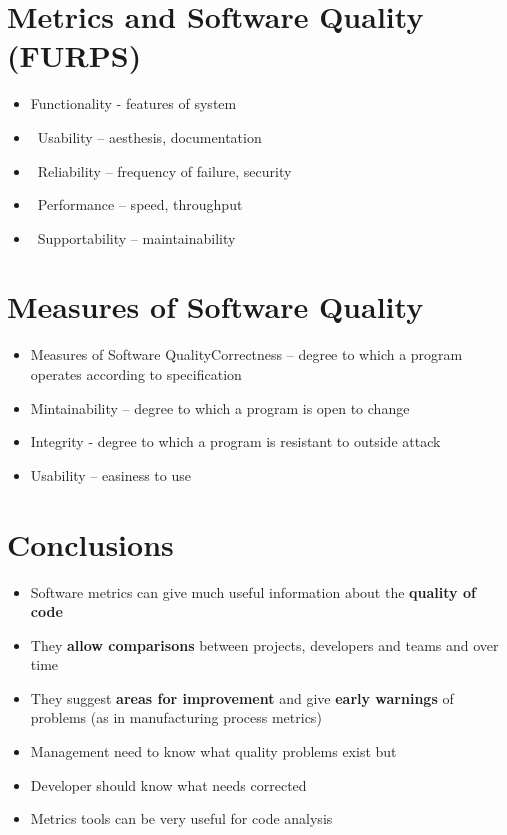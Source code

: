 \documentclass{article}
\begin{document}
\section{Metrics and Software Quality (FURPS)}
\begin{itemize}
  \item Functionality		-	features	of	system	
  \item  Usability	–	aesthesis,	documentation	
  \item  Reliability	–	frequency	of	failure,	security	
  \item  Performance	–	speed,	throughput	
  \item  Supportability	–	maintainability
\end{itemize}

\section{Measures of Software Quality}

\begin{itemize}
  \item Measures of Software QualityCorrectness	–	degree	to	which	a	program	operates	according	to	specification
  \item Mintainability	–	degree	to	which	a	program	is	open	to	change
  \item Integrity	-	degree	to	which	a	program	is	resistant	to	outside	attack	
  \item Usability	–	easiness	to	use
\end{itemize}

\section{Conclusions}
\begin{itemize}
  \item Software metrics can give much useful information about the \textbf{quality of code}
  \item They \textbf{allow comparisons} between projects, developers and teams and over time 
  \item They suggest \textbf{areas for improvement} and give \textbf{early warnings} of problems (as in manufacturing process metrics) 
  \item Management need to know what quality problems exist but 
  \item Developer should know what needs corrected 
  \item Metrics tools can be very useful for code analysis 
\end{itemize}
\end{document}
